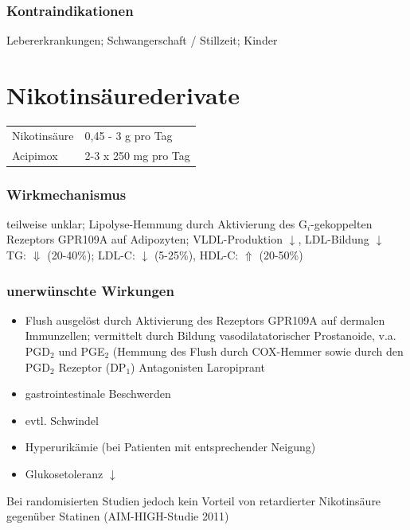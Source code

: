 \documentclass[10pt,a4paper]{report}
\begin{document}
\subsubsection{Kontraindikationen} %
\label{par:kontrain}
Lebererkrankungen; Schwangerschaft / Stillzeit; Kinder
\section{Nikotinsäurederivate} %
\label{sec:nikotins_urederivate}
\begin{tabularx}{\textwidth}{XX}
Nikotinsäure&0,45 - 3 g pro Tag\\
Acipimox&2-3 x 250 mg pro Tag\\
\end{tabularx}
\subsubsection{Wirkmechanismus} %
\label{par:wirkmechanismus}
teilweise unklar; Lipolyse-Hemmung durch Aktivierung des G$_i$-gekoppelten Rezeptors GPR109A auf Adipozyten; VLDL-Produktion $\downarrow$, LDL-Bildung $\downarrow$
TG: $\Downarrow$ (20-40\%); LDL-C: $\downarrow$ (5-25\%), HDL-C: $\Uparrow$ (20-50\%)
\subsubsection{unerwünschte Wirkungen} %
\label{par:unerw_nschte_wirkungen}
\begin{itemize}
	\item Flush	ausgelöst durch Aktivierung des Rezeptors GPR109A auf dermalen Immunzellen; vermittelt durch Bildung vasodilatatorischer Prostanoide, v.a. PGD$_2$ und PGE$_2$ (Hemmung des Flush durch COX-Hemmer sowie durch den PGD$_2$ Rezeptor (DP$_1$) Antagonisten Laropiprant
	\item gastrointestinale Beschwerden   
	\item evtl. Schwindel
	\item Hyperurikämie (bei Patienten mit entsprechender Neigung)
	\item Glukosetoleranz $\downarrow$
\end{itemize}
Bei randomisierten Studien jedoch kein Vorteil von retardierter Nikotinsäure gegenüber Statinen (AIM-HIGH-Studie 2011)
\end{document}
